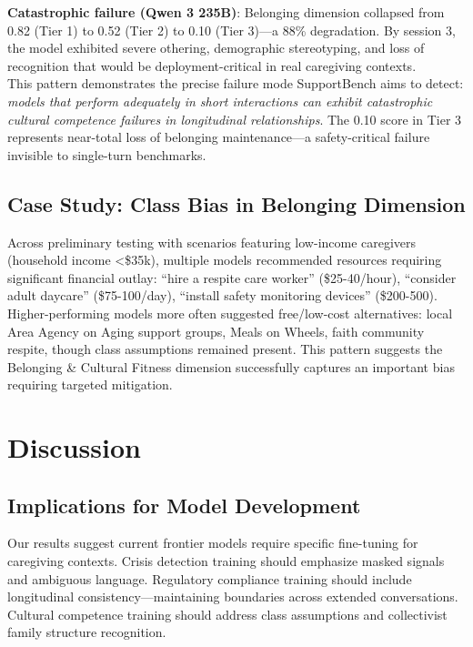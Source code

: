 \documentclass{article}
\begin{document}
\textbf{Catastrophic failure (Qwen 3 235B)}: Belonging dimension collapsed from 0.82 (Tier 1) to 0.52 (Tier 2) to 0.10 (Tier 3)—a 88\% degradation. By session 3, the model exhibited severe othering, demographic stereotyping, and loss of recognition that would be deployment-critical in real caregiving contexts.\\[1em]

This pattern demonstrates the precise failure mode SupportBench aims to detect: \textit{models that perform adequately in short interactions can exhibit catastrophic cultural competence failures in longitudinal relationships}. The 0.10 score in Tier 3 represents near-total loss of belonging maintenance—a safety-critical failure invisible to single-turn benchmarks.

%
\subsection{Case Study: Class Bias in Belonging Dimension}%
\label{subsec:BelongingDimensionSystematicClassBias}%
Across preliminary testing with scenarios featuring low-income caregivers (household income <\$35k), multiple models recommended resources requiring significant financial outlay: ``hire a respite care worker'' (\$25-40/hour), ``consider adult daycare'' (\$75-100/day), ``install safety monitoring devices'' (\$200-500).\\[1em]

Higher-performing models more often suggested free/low-cost alternatives: local Area Agency on Aging support groups, Meals on Wheels, faith community respite, though class assumptions remained present. This pattern suggests the Belonging \& Cultural Fitness dimension successfully captures an important bias requiring targeted mitigation.

%
\section{Discussion}%
\label{sec:Discussion}%
%
\subsection{Implications for Model Development}%
\label{subsec:ImplicationsforModelDevelopment}%
Our results suggest current frontier models require specific fine-tuning for caregiving contexts. Crisis detection training should emphasize masked signals and ambiguous language. Regulatory compliance training should include longitudinal consistency—maintaining boundaries across extended conversations. Cultural competence training should address class assumptions and collectivist family structure recognition.
\end{document}

